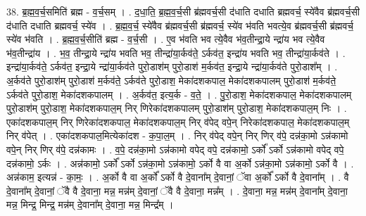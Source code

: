 \documentclass[17pt]{extarticle}
\begin{document}
38. ब्र॒ह्म॒व॒र्च॒समिति॑ ब्रह्म - व॒र्च॒सम् । . द॒धा॒ति॒ ब्र॒ह्म॒व॒र्च॒सी ब्र॑ह्मवर्च॒सी द॑धाति दधाति ब्रह्मवर्च॒ स्ये॑वैव ब्र॑ह्मवर्च॒सी द॑धाति दधाति ब्रह्मवर्च॒ स्ये॑व । . ब्र॒ह्म॒व॒र्च॒ स्ये॑वैव ब्र॑ह्मवर्च॒सी ब्र॑ह्मवर्च॒ स्ये॑व भ॑वति भवत्ये॒व ब्र॑ह्मवर्च॒सी ब्र॑ह्मवर्च॒ स्ये॑व भ॑वति । . ब्र॒ह्म॒व॒र्च॒सीति॑ ब्रह्म - व॒र्च॒सी । . ए॒व भ॑वति भव त्ये॒वैव भ॑व॒तीन्द्रा॒ये न्द्रा॑य भव त्ये॒वैव भ॑व॒तीन्द्रा॑य । . भ॒व॒ तीन्द्रा॒ये न्द्रा॑य भवति भव॒ तीन्द्रा॑या॒र्कव॑ते॒ ऽर्कव॑त॒ इन्द्रा॑य भवति भव॒ तीन्द्रा॑या॒र्कव॑ते । . इन्द्रा॑या॒र्कव॑ते॒ ऽर्कव॑त॒ इन्द्रा॒ये न्द्रा॑या॒र्कव॑ते पुरो॒डाश॑म् पुरो॒डाश॑ म॒र्कव॑त॒ इन्द्रा॒ये न्द्रा॑या॒र्कव॑ते पुरो॒डाश᳚म् । . अ॒र्कव॑ते पुरो॒डाश॑म् पुरो॒डाश॑ म॒र्कव॑ते॒ ऽर्कव॑ते पुरो॒डाश॒ मेका॑दशकपाल॒ मेका॑दशकपालम् पुरो॒डाश॑ म॒र्कव॑ते॒ ऽर्कव॑ते पुरो॒डाश॒ मेका॑दशकपालम् । . अ॒र्कव॑त॒ इत्य॒र्क - व॒ते॒ । . पु॒रो॒डाश॒ मेका॑दशकपाल॒ मेका॑दशकपालम् पुरो॒डाश॑म् पुरो॒डाश॒ मेका॑दशकपाल॒म् निर् णिरेका॑दशकपालम् पुरो॒डाश॑म् पुरो॒डाश॒ मेका॑दशकपाल॒म् निः । . एका॑दशकपाल॒म् निर् णिरेका॑दशकपाल॒ मेका॑दशकपाल॒म् निर् व॑पेद् वपे॒न् निरेका॑दशकपाल॒ मेका॑दशकपाल॒म् निर् व॑पेत् । . एका॑दशकपाल॒मित्येका॑दश - क॒पा॒ल॒म् । . निर् व॑पेद् वपे॒न् निर् णिर् व॑पे॒ दन्न॑का॒मो ऽन्न॑कामो वपे॒न् निर् णिर् व॑पे॒ दन्न॑कामः । . व॒पे॒ दन्न॑का॒मो ऽन्न॑कामो वपेद् वपे॒ दन्न॑कामो॒ ऽर्को᳚ ऽर्को ऽन्न॑कामो वपेद् वपे॒ दन्न॑कामो॒ ऽर्कः । . अन्न॑कामो॒ ऽर्को᳚ ऽर्को ऽन्न॑का॒मो ऽन्न॑कामो॒ ऽर्को वै वा अ॒र्को ऽन्न॑का॒मो ऽन्न॑कामो॒ ऽर्को वै । . अन्न॑काम॒ इत्यन्न॑ - का॒मः॒ । . अ॒र्को वै वा अ॒र्को᳚ ऽर्को वै दे॒वाना᳚म् दे॒वानां॒ ॅवा अ॒र्को᳚ ऽर्को वै दे॒वाना᳚म् । . वै दे॒वाना᳚म् दे॒वानां॒ ॅवै वै दे॒वाना॒ मन्न॒ मन्न॑म् दे॒वानां॒ ॅवै वै दे॒वाना॒ मन्न᳚म् । . दे॒वाना॒ मन्न॒ मन्न॑म् दे॒वाना᳚म् दे॒वाना॒ मन्न॒ मिन्द्र॒ मिन्द्र॒ मन्न॑म् दे॒वाना᳚म् दे॒वाना॒ मन्न॒ मिन्द्र᳚म् । \newline
\end{document}
